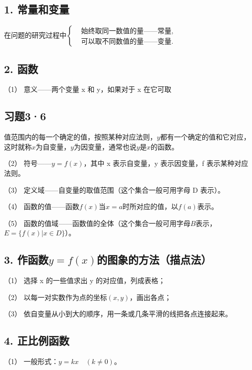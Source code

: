 \subsection{1. 常量和变量}

在问题的研究过程中\(\left\{\begin{aligned}& \text{始终取同一数值的量}——\text{常量},\\& \text{可以取不同数值的量}——\text{变量}.\end{aligned}\right.\)

\subsection{2. 函数}

（1） 意义------两个变量 x 和 y，如果对于 x 在它可取

\subsection{习题3·6}

值范围内的每一个确定的值，按照某种对应法则，\(y\)都有一个确定的值和它对应，这时就称\(x\)为自变量，\(y\)为因变量，通常也说\(y\)是\(x\)的函数。

（2） 符号------\(y = f(x)\)，其中 x 表示自变量，y 表示因变量，f
表示某种对应法则。

（3） 定义域------自变量的取值范围（这个集合一般可用字母 D 表示）。

（4）
函数的值------函数\(f(x)\)当\(x = a\)时所对应的值，以\(f(a)\)表示。

（5）
函数的值域------函数值的全体（这个集合一般可用字母\(B\)表示，\(E = \{f(x) | x \in D\}\)）。

\subsection{\texorpdfstring{3. 作函数\(y = f(x)\)的图象的方法（描点法）}{3. 作函数y = f(x)的图象的方法（描点法）}}

（1） 选择 x 的一些值求出 y 的对应值，列成表格；

（2） 以每一对实数作为点的坐标\((x, y)\)，画出各点；

（3） 依自变量从小到大的顺序，用一条或几条平滑的线把各点连接起来。

\subsection{4. 正比例函数}

（1） 一般形式：\(y = kx \quad (k \neq 0)\)。

